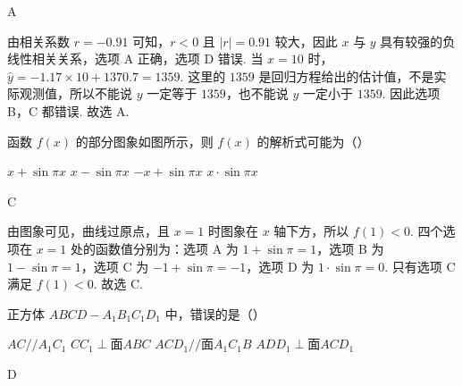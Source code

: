 \documentclass[UTF8,a4paper,oneside,11pt]{ctexbook}
\begin{document}
\begin{answer}
A
\end{answer}

\begin{solution}
由相关系数 \(r=-0.91\) 可知，\(r<0\) 且 \(|r|=0.91\) 较大，因此 \(x\) 与 \(y\) 具有较强的负线性相关关系，选项 A 正确，选项 D 错误.
当 \(x=10\) 时，\(\hat y=-1.17\times 10+1370.7=1359\). 这里的 \(1359\) 是回归方程给出的估计值，不是实际观测值，所以不能说 \(y\) 一定等于 \(1359\)，也不能说 \(y\) 一定小于 \(1359\). 因此选项 B，C 都错误.
故选 A.
\end{solution}

\begin{problem}
函数 \(f(x)\) 的部分图象如图所示，则 \(f(x)\) 的解析式可能为（\quad）


\choices
    {\(x+\sin \pi x\)}
    {\(x-\sin \pi x\)}
    {\(-x+\sin \pi x\)}
    {\(x\cdot \sin \pi x\)}
\end{problem}

\begin{answer}
C
\end{answer}

\begin{solution}
由图象可见，曲线过原点，且 \(x=1\) 时图象在 \(x\) 轴下方，所以 \(f(1)<0\).
四个选项在 \(x=1\) 处的函数值分别为：选项 A 为 \(1+\sin \pi=1\)，选项 B 为 \(1-\sin \pi=1\)，选项 C 为 \(-1+\sin \pi=-1\)，选项 D 为 \(1\cdot \sin \pi=0\). 只有选项 C 满足 \(f(1)<0\).
故选 C.
\end{solution}

\begin{problem}
正方体 \(ABCD-A_1B_1C_1D_1\) 中，错误的是（\quad）

\choices
    {\(AC//A_1C_1\)}
    {\(CC_1\perp \text{面} ABC\)}
    {\(ACD_1//\text{面} A_1C_1B\)}
    {\(ADD_1\perp \text{面} ACD_1\)}
\end{problem}

\begin{answer}
D
\end{answer}
\end{document}
